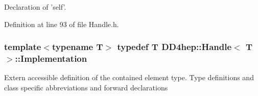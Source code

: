 Declaration of 'self'. 

Definition at line 93 of file Handle.h.\hypertarget{class_d_d4hep_1_1_handle_ad7ff728a25806079516b8965b9113f1a}{
\subsubsection[{Implementation}]{\setlength{\rightskip}{0pt plus 5cm}template$<$typename T$>$ typedef {\bf T} {\bf DD4hep::Handle}$<$ {\bf T} $>$::{\bf Implementation}}}
\label{class_d_d4hep_1_1_handle_ad7ff728a25806079516b8965b9113f1a}


Extern accessible definition of the contained element type. Type definitions and class specific abbreviations and forward declarations 

